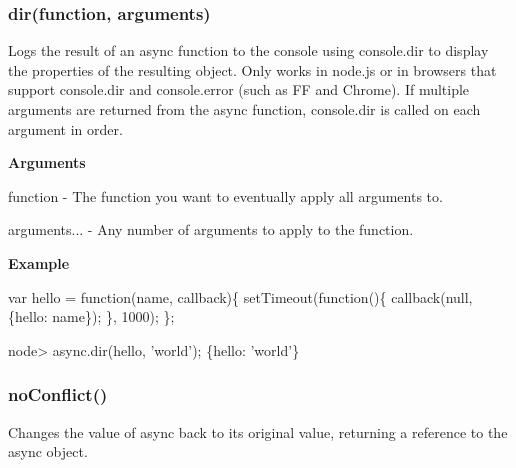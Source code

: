 \label{_dir}%
 \subsubsection*{dir(function, arguments)}

Logs the result of an async function to the console using console.\+dir to display the properties of the resulting object. Only works in node.\+js or in browsers that support console.\+dir and console.\+error (such as FF and Chrome). If multiple arguments are returned from the async function, console.\+dir is called on each argument in order.

{\bfseries Arguments}


\begin{DoxyItemize}
\item function -\/ The function you want to eventually apply all arguments to.
\item arguments... -\/ Any number of arguments to apply to the function.
\end{DoxyItemize}

{\bfseries Example}


\begin{DoxyCode}
var hello = function(name, callback)\{
    setTimeout(function()\{
        callback(null, \{hello: name\});
    \}, 1000);
\};
\end{DoxyCode}
 
\begin{DoxyCode}
node> async.dir(hello, 'world');
\{hello: 'world'\}
\end{DoxyCode}
 



\label{_noConflict}%
 \subsubsection*{no\+Conflict()}

Changes the value of async back to its original value, returning a reference to the async object. 